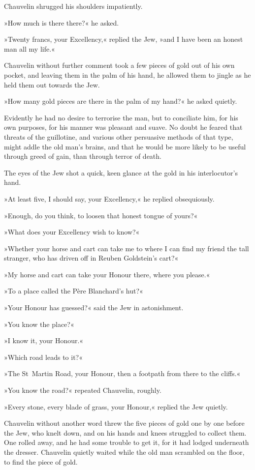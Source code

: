 Chauvelin shrugged his shoulders impatiently.

»How much is there there?« he asked.

»Twenty francs, your Excellency,« replied the Jew, »and I have been an honest man all my life.«

Chauvelin without further comment took a few pieces of gold out of his own pocket, and leaving them in the palm of his hand, he allowed them to jingle as he held them out towards the Jew.

»How many gold pieces are there in the palm of my hand?« he asked quietly.

Evidently he had no desire to terrorise the man, but to conciliate him, for his own purposes, for his manner was pleasant and suave. No doubt he feared that threats of the guillotine, and various other persuasive methods of that type, might addle the old man's brains, and that he would be more likely to be useful through greed of gain, than through terror of death.

The eyes of the Jew shot a quick, keen glance at the gold in his interlocutor's hand.

»At least five, I should say, your Excellency,« he replied obsequiously.

»Enough, do you think, to loosen that honest tongue of yours?«

»What does your Excellency wish to know?«

»Whether your horse and cart can take me to where I can find my friend the tall stranger, who has driven off in Reuben Goldstein's cart?«

»My horse and cart can take your Honour there, where you please.«

»To a place called the Père Blanchard's hut?«

»Your Honour has guessed?« said the Jew in astonishment.

»You know the place?«

»I know it, your Honour.«

»Which road leads to it?«

»The St~Martin Road, your Honour, then a footpath from there to the cliffs.«

»You know the road?« repeated Chauvelin, roughly.

»Every stone, every blade of grass, your Honour,« replied the Jew quietly.

Chauvelin without another word threw the five pieces of gold one by one before the Jew, who knelt down, and on his hands and knees struggled to collect them. One rolled away, and he had some trouble to get it, for it had lodged underneath the dresser. Chauvelin quietly waited while the old man scrambled on the floor, to find the piece of gold.

